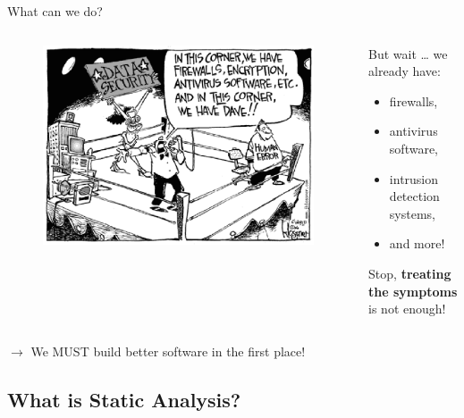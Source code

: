 \documentclass[aspectratio=169]{beamer}
\begin{document}
  \begin{frame}{What can we do?}
    \vspace{-1.4em}
    \begin{columns}[b]
      \begin{column}{0.5\textwidth}
        \begin{figure}
          \centering
          \includegraphics[scale=0.38]{figures/dave}
        \end{figure}
      \end{column}
      \begin{column}{0.5\textwidth}
        But wait \ldots{} we already have:
        \begin{itemize}
        \item firewalls,
        \item antivirus software,
        \item intrusion detection systems,
        \item and more!
        \end{itemize}
        \pause
        Stop, \textbf{treating the symptoms} is not enough!
      \end{column}
    \end{columns}
    \centering
    \vfill
    \pause
    {\LARGE $\to$ We MUST build \alert{better software} in the first place!}
  \end{frame}

  \subsection{What is Static Analysis?}
\end{document}
